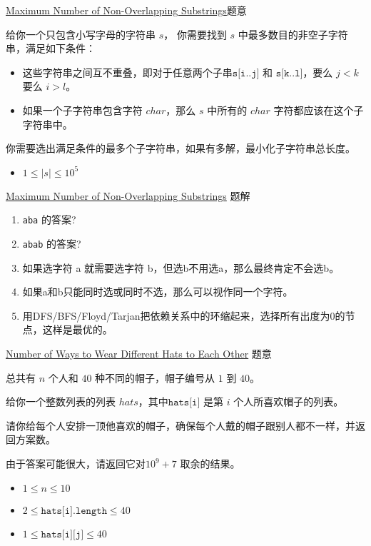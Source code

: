 \documentclass{beamer}
\begin{document}
\begin{frame}{\href{https://leetcode-cn.com/problems/maximum-number-of-non-overlapping-substrings/}{Maximum Number of Non-Overlapping Substrings}}{题意}

给你一个只包含小写字母的字符串 $s$， 你需要找到 $s$ 中最多数目的非空子字符串，满足如下条件：

\begin{itemize}
    \item 这些字符串之间互不重叠，即对于任意两个子串$\texttt{s[i..j]}$ 和 $\texttt{s[k..l]}$，要么 $j < k$ 要么 $i > l$。
    \item 如果一个子字符串包含字符 $char$，那么 $s$ 中所有的 $char$ 字符都应该在这个子字符串中。
\end{itemize}

你需要选出满足条件的最多个子字符串，如果有多解，最小化子字符串总长度。
\begin{itemize}
    \item $1 \leq |s| \leq 10 ^ 5$
\end{itemize}
\end{frame}


\begin{frame}{\href{https://leetcode-cn.com/problems/maximum-number-of-non-overlapping-substrings/}{Maximum Number of Non-Overlapping Substrings}}
{题解}

\begin{enumerate}
    \item \texttt{aba} 的答案?
    \item \texttt{abab} 的答案?
    \item 如果选字符 a 就需要选字符 b，但选b不用选a，那么最终肯定不会选b。
    \item 如果a和b只能同时选或同时不选，那么可以视作同一个字符。
    \item 用DFS/BFS/Floyd/Tarjan把依赖关系中的环缩起来，选择所有出度为0的节点，这样是最优的。
\end{enumerate}
\end{frame}








\begin{frame}{\href{https://leetcode-cn.com/problems/number-of-ways-to-wear-different-hats-to-each-other/}{Number of Ways to Wear Different Hats to Each Other}}
{题意}

总共有 $n$ 个人和 $40$ 种不同的帽子，帽子编号从 $1$ 到 $40$。

给你一个整数列表的列表 $hats$，其中$\texttt{hats[i]}$ 是第 $i$ 个人所喜欢帽子的列表。

请你给每个人安排一顶他喜欢的帽子，确保每个人戴的帽子跟别人都不一样，并返回方案数。

由于答案可能很大，请返回它对$10^9 + 7$ 取余的结果。
\begin{itemize}
    \item $1 \leq n \leq 10$
    \item $2 \leq \texttt{hats[i].length} \leq 40$
    \item $1 \leq \texttt{hats[i][j]} \leq 40$
\end{itemize}
\end{frame}
\end{document}
